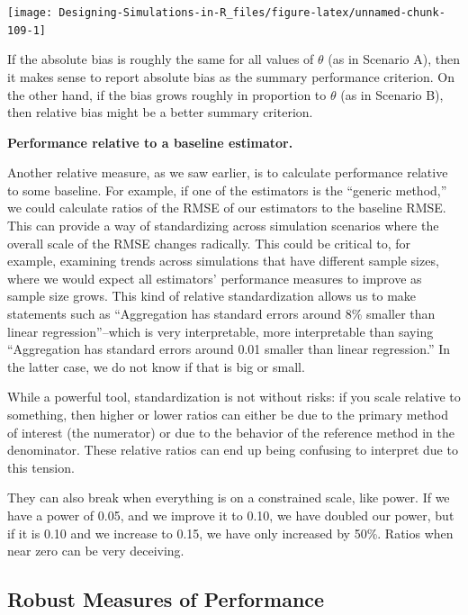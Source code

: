 \documentclass[
]{book}
\begin{document}
\begin{center}\texttt{[image: Designing-Simulations-in-R\_files/figure-latex/unnamed-chunk-109-1]} \end{center}

If the absolute bias is roughly the same for all values of \(\theta\) (as in Scenario A), then it makes sense to report absolute bias as the summary performance criterion.
On the other hand, if the bias grows roughly in proportion to \(\theta\) (as in Scenario B), then relative bias might be a better summary criterion.

\textbf{Performance relative to a baseline estimator.}

Another relative measure, as we saw earlier, is to calculate performance relative to some baseline.
For example, if one of the estimators is the ``generic method,'' we could calculate ratios of the RMSE of our estimators to the baseline RMSE.
This can provide a way of standardizing across simulation scenarios where the overall scale of the RMSE changes radically.
This could be critical to, for example, examining trends across simulations that have different sample sizes, where we would expect all estimators' performance measures to improve as sample size grows.
This kind of relative standardization allows us to make statements such as ``Aggregation has standard errors around 8\% smaller than linear regression''--which is very interpretable, more interpretable than saying ``Aggregation has standard errors around 0.01 smaller than linear regression.''
In the latter case, we do not know if that is big or small.

While a powerful tool, standardization is not without risks: if you scale relative to something, then higher or lower ratios can either be due to the primary method of interest (the numerator) or due to the behavior of the reference method in the denominator.
These relative ratios can end up being confusing to interpret due to this tension.

They can also break when everything is on a constrained scale, like power.
If we have a power of 0.05, and we improve it to 0.10, we have doubled our power, but if it is 0.10 and we increase to 0.15, we have only increased by 50\%.
Ratios when near zero can be very deceiving.

\subsection{Robust Measures of Performance}\label{robust-measures-of-performance}
\end{document}

